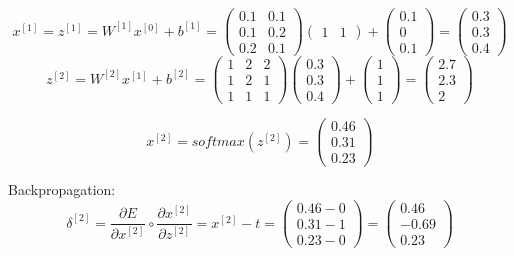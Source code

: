 \documentclass{article}
\begin{document}
\begin{enumerate}[leftmargin=\labelsep]
\begin{equation*}
  x^{[1]} = z^{[1]} = W^{[1]} x^{[0]} + b^{[1]} =
  \begin{pmatrix}
    0.1 & 0.1 \\
    0.1 & 0.2 \\
    0.2 & 0.1 
  \end{pmatrix}
  \begin{pmatrix}
    1 & 1 
  \end{pmatrix} +
  \begin{pmatrix}
    0.1 \\
    0 \\
    0.1
  \end{pmatrix} =
  \begin{pmatrix}
    0.3 \\
    0.3 \\
    0.4
  \end{pmatrix}
\end{equation*}
\begin{equation*}
  z^{[2]} = W^{[2]} x^{[1]} + b^{[2]} =
  \begin{pmatrix}
    1 & 2 & 2 \\
    1 & 2 & 1 \\
    1 & 1 & 1
  \end{pmatrix}
  \begin{pmatrix}
    0.3 \\
    0.3 \\
    0.4
  \end{pmatrix} +
  \begin{pmatrix}
    1 \\
    1 \\
    1
  \end{pmatrix} =
  \begin{pmatrix}
    2.7 \\
    2.3 \\
    2
  \end{pmatrix}
\end{equation*}

\begin{equation*}
  x^{[2]} = softmax(z^{[2]}) =
  \begin{pmatrix}
    0.46 \\
    0.31 \\
    0.23
  \end{pmatrix}
\end{equation*}

Backpropagation:
\begin{equation*}
  \delta^{[2]}=\frac{\partial E}{\partial x^{[2]}} \circ \frac{\partial x^{[2]}}{\partial z^{[2]}} = x^{[2]} - t = 
  \begin{pmatrix}
    0.46 - 0 \\
    0.31 - 1 \\
    0.23 - 0
    \end{pmatrix} =
    \begin{pmatrix}
      0.46 \\
      -0.69 \\
      0.23
      \end{pmatrix}
\end{equation*}


\end{enumerate}
\end{document}
